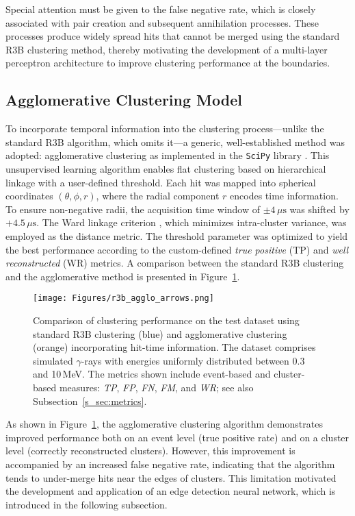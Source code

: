 Special attention must be given to the false negative rate, which is closely associated with pair creation and subsequent annihilation processes. These processes produce widely spread hits that cannot be merged using the standard R3B clustering method, thereby motivating the development of a multi-layer perceptron architecture to improve clustering performance at the boundaries.\newline

\subsection{Agglomerative Clustering Model}
To incorporate temporal information into the clustering process---unlike the standard R3B algorithm, which omits it---a generic, well-established method was adopted: agglomerative clustering \cite{Nielsen2016} as implemented in the \texttt{SciPy} library \cite{virtanen2020scipy}. This unsupervised learning algorithm enables flat clustering based on hierarchical linkage with a user-defined threshold.\newline
Each hit was mapped into spherical coordinates \((\theta, \phi, r)\), where the radial component \(r\) encodes time information. To ensure non-negative radii, the acquisition time window of \(\pm 4\,\mu\mathrm{s}\) was shifted by \(+4.5\,\mu\mathrm{s}\). The Ward linkage criterion \cite{nielsen2016hierarchical}, which minimizes intra-cluster variance, was employed as the distance metric.\newline
The threshold parameter was optimized to yield the best performance according to the custom-defined \textit{true positive} (TP) and \textit{well reconstructed} (WR) metrics. A comparison between the standard R3B clustering and the agglomerative method is presented in Figure~\ref{fig:r3b_agglo_metrics}.
\begin{figure}[!htb]
       \centering
       \texttt{[image: Figures/r3b\_agglo\_arrows.png]}
       \caption{Comparison of clustering performance on the test dataset using standard R3B clustering (blue) and agglomerative clustering (orange) incorporating hit-time information. The dataset comprises simulated $\gamma$-rays with energies uniformly distributed between 0.3 and 10\,MeV. The metrics shown include event-based and cluster-based measures: \textit{TP}, \textit{FP}, \textit{FN}, \textit{FM}, and \textit{WR}; see also Subsection~\ref{s_sec:metrics}.}
       \label{fig:r3b_agglo_metrics}%
\end{figure}
As shown in Figure~\ref{fig:r3b_agglo_metrics}, the agglomerative clustering algorithm demonstrates improved performance both on an event level (true positive rate) and on a cluster level (correctly reconstructed clusters). However, this improvement is accompanied by an increased false negative rate, indicating that the algorithm tends to under-merge hits near the edges of clusters. This limitation motivated the development and application of an edge detection neural network, which is introduced in the following subsection.

